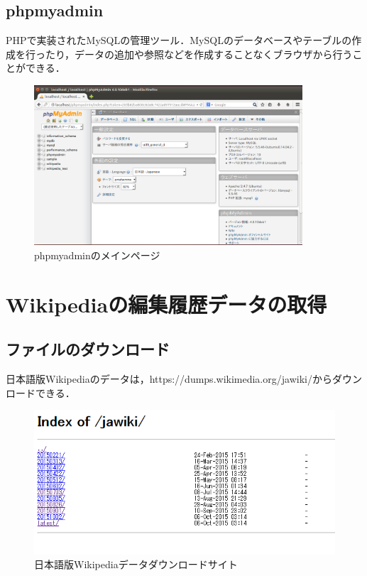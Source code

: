 \subsection{phpmyadmin}

PHPで実装されたMySQLの管理ツール．MySQLのデータベースやテーブルの作成を行ったり，データの追加や参照などを作成することなくブラウザから行うことができる．

\begin{figure}[H]
\centering
\includegraphics[width=10cm]{phpmyadmin_main.png}
\caption{phpmyadminのメインページ}\label{サンプル図}
\end{figure}

\section{Wikipediaの編集履歴データの取得}

\subsection{ファイルのダウンロード}

日本語版Wikipediaのデータは，https://dumps.wikimedia.org/jawiki/からダウンロードできる．

\begin{figure}[H]
\centering
\includegraphics[width=14cm]{Index_of_jawiki.PNG}
\caption{日本語版Wikipediaデータダウンロードサイト}\label{サンプル図}
\end{figure}

